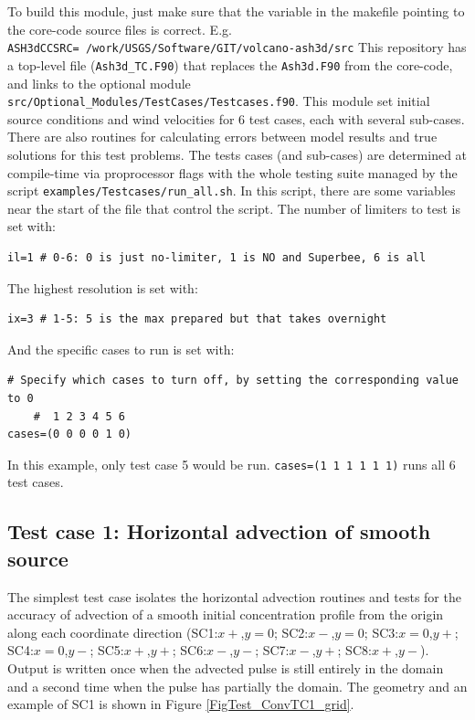 To build this module, just make sure that the variable in the makefile
pointing to the core-code source files is correct. E.g.\\
\texttt{ASH3dCCSRC=~/work/USGS/Software/GIT/volcano-ash3d/src}
This repository has a top-level file (\texttt{Ash3d\_TC.F90}) that
replaces the \texttt{Ash3d.F90} from the core-code, and links to
the optional module \texttt{src/Optional\_Modules/TestCases/Testcases.f90}.
This module set initial source conditions and wind velocities for 6
test cases, each with several sub-cases. There are also routines for
calculating errors between model results and true solutions for this
test problems. The tests cases (and sub-cases) are determined at compile-time
via proprocessor flags with the whole testing suite managed by the script
\texttt{examples/Testcases/run\_all.sh}. In this script, there are some
variables near the start of the file that control the script.
The number of limiters to test is set with:
\small
\begin{verbatim}
il=1 # 0-6: 0 is just no-limiter, 1 is NO and Superbee, 6 is all
\end{verbatim}
\normalsize
The highest resolution is set with:
\small
\begin{verbatim}
ix=3 # 1-5: 5 is the max prepared but that takes overnight
\end{verbatim}
\normalsize
And the specific cases to run is set with:
\small
\begin{verbatim}
# Specify which cases to turn off, by setting the corresponding value to 0
    #  1 2 3 4 5 6
cases=(0 0 0 0 1 0)
\end{verbatim}
\normalsize
In this example, only test case 5 would be run. \texttt{cases=(1 1 1 1 1 1)} runs
all 6 test cases.
\subsection{Test case 1: Horizontal advection of smooth source}
The simplest test case isolates the horizontal advection routines and tests
for the accuracy of advection of a smooth initial concentration profile from
the origin along each coordinate direction
(SC1:$x+$,$y=0$; SC2:$x-$,$y=0$; SC3:$x=0$,$y+$; SC4:$x=0$,$y-$;
SC5:$x+$,$y+$; SC6:$x-$,$y-$; SC7:$x-$,$y+$; SC8:$x+$,$y-$).
Output is written once when the advected pulse is still entirely in the domain
and a second time when the pulse has partially the domain. The geometry and
an example of SC1 is shown in Figure \ref{FigTest_ConvTC1_grid}.

